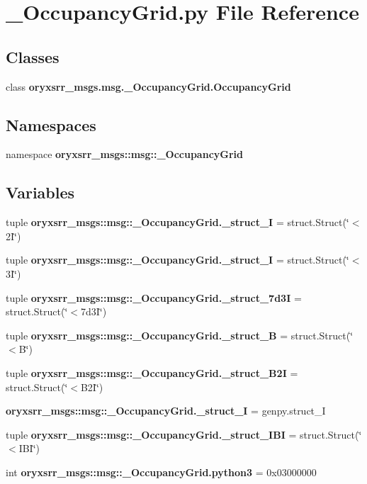 \section{\-\_\-\-Occupancy\-Grid.\-py \-File \-Reference}
\label{__OccupancyGrid_8py}
\subsection*{\-Classes}
\begin{DoxyCompactItemize}
\item 
class {\bf oryxsrr\-\_\-msgs.\-msg.\-\_\-\-Occupancy\-Grid.\-Occupancy\-Grid}
\end{DoxyCompactItemize}
\subsection*{\-Namespaces}
\begin{DoxyCompactItemize}
\item 
namespace {\bf oryxsrr\-\_\-msgs\-::msg\-::\-\_\-\-Occupancy\-Grid}
\end{DoxyCompactItemize}
\subsection*{\-Variables}
\begin{DoxyCompactItemize}
\item 
tuple {\bf oryxsrr\-\_\-msgs\-::msg\-::\-\_\-\-Occupancy\-Grid.\-\_\-struct\-\_\-I} = struct.\-Struct(\char`\"{}$<$2\-I\char`\"{})
\item 
tuple {\bf oryxsrr\-\_\-msgs\-::msg\-::\-\_\-\-Occupancy\-Grid.\-\_\-struct\-\_\-I} = struct.\-Struct(\char`\"{}$<$3\-I\char`\"{})
\item 
tuple {\bf oryxsrr\-\_\-msgs\-::msg\-::\-\_\-\-Occupancy\-Grid.\-\_\-struct\-\_\-7d3\-I} = struct.\-Struct(\char`\"{}$<$7d3\-I\char`\"{})
\item 
tuple {\bf oryxsrr\-\_\-msgs\-::msg\-::\-\_\-\-Occupancy\-Grid.\-\_\-struct\-\_\-\-B} = struct.\-Struct(\char`\"{}$<$\-B\char`\"{})
\item 
tuple {\bf oryxsrr\-\_\-msgs\-::msg\-::\-\_\-\-Occupancy\-Grid.\-\_\-struct\-\_\-\-B2\-I} = struct.\-Struct(\char`\"{}$<$\-B2\-I\char`\"{})
\item 
{\bf oryxsrr\-\_\-msgs\-::msg\-::\-\_\-\-Occupancy\-Grid.\-\_\-struct\-\_\-\-I} = genpy.\-struct\-\_\-\-I
\item 
tuple {\bf oryxsrr\-\_\-msgs\-::msg\-::\-\_\-\-Occupancy\-Grid.\-\_\-struct\-\_\-\-I\-B\-I} = struct.\-Struct(\char`\"{}$<$\-I\-B\-I\char`\"{})
\item 
int {\bf oryxsrr\-\_\-msgs\-::msg\-::\-\_\-\-Occupancy\-Grid.\-python3} = 0x03000000
\end{DoxyCompactItemize}

